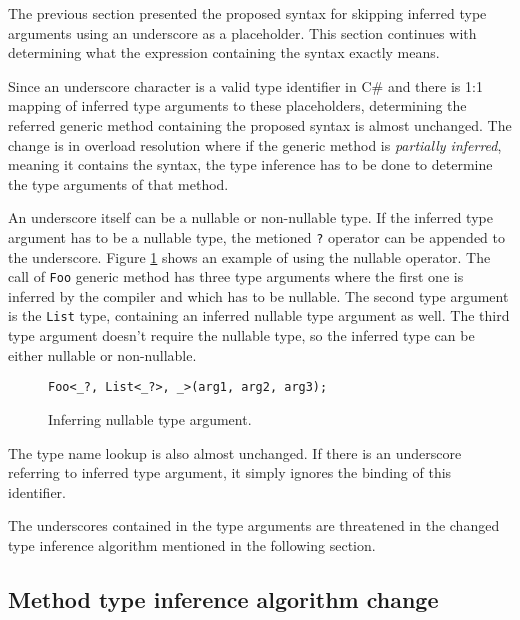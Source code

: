 The previous section presented the proposed syntax for skipping inferred type arguments using an underscore as a placeholder. 
This section continues with determining what the expression containing the syntax exactly means.
\par
Since an underscore character is a valid type identifier in C\# and there is
1:1 mapping of inferred type arguments to these placeholders, determining the referred generic method containing the proposed syntax is almost unchanged. 
The change is in overload resolution where if the generic method is \textit{partially inferred}, meaning it contains the syntax, the type inference has to be done to determine the type arguments of that method.
\par
An underscore itself can be a nullable or non-nullable type. 
If the inferred type argument has to be a nullable type, the metioned \texttt{?} operator can be appended to the underscore. 
Figure \ref{img53:null} shows an example of using the nullable operator. 
The call of \texttt{Foo} generic method has three type arguments where the first one is inferred by the compiler and which has to be nullable. 
The second type argument is the \texttt{List} type, containing an inferred nullable type argument as well. 
The third type argument doesn’t require the nullable type, so the inferred type can be either nullable or non-nullable.
\begin{figure}[h!]
\begin{lstlisting}[style=csharp]
Foo<_?, List<_?>, _>(arg1, arg2, arg3);
\end{lstlisting}
\caption{Inferring nullable type argument.}
\label{img53:null}
\end{figure}
\par
The type name lookup is also almost unchanged. 
If there is an underscore
referring to inferred type argument, it simply ignores the binding of this identifier.
\par
The underscores contained in the type arguments are threatened in the changed type inference algorithm mentioned in the following section.

\subsection{Method type inference algorithm change}

